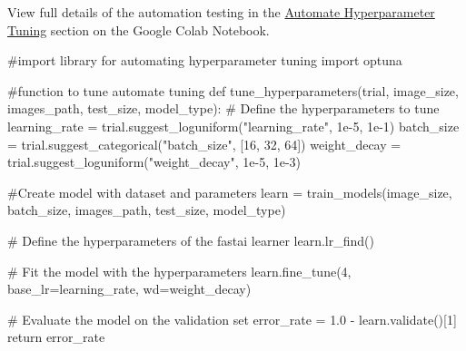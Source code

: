 \documentclass[
  letterpaper,
  DIV=11,
  numbers=noendperiod]{scrartcl}
\newenvironment{Shaded}{\begin{snugshade}}{\end{snugshade}}
\newcommand{\CommentTok}[1]{\textcolor[rgb]{0.37,0.37,0.37}{#1}}
\newcommand{\ControlFlowTok}[1]{\textcolor[rgb]{0.00,0.23,0.31}{#1}}
\newcommand{\DecValTok}[1]{\textcolor[rgb]{0.68,0.00,0.00}{#1}}
\newcommand{\FloatTok}[1]{\textcolor[rgb]{0.68,0.00,0.00}{#1}}
\newcommand{\ImportTok}[1]{\textcolor[rgb]{0.00,0.46,0.62}{#1}}
\newcommand{\KeywordTok}[1]{\textcolor[rgb]{0.00,0.23,0.31}{#1}}
\newcommand{\NormalTok}[1]{\textcolor[rgb]{0.00,0.23,0.31}{#1}}
\newcommand{\OperatorTok}[1]{\textcolor[rgb]{0.37,0.37,0.37}{#1}}
\newcommand{\StringTok}[1]{\textcolor[rgb]{0.13,0.47,0.30}{#1}}
\begin{document}
\begin{tcolorbox}[enhanced jigsaw, opacityback=0, toprule=.15mm, colbacktitle=quarto-callout-note-color!10!white, opacitybacktitle=0.6, leftrule=.75mm, colback=white, breakable, bottomtitle=1mm, arc=.35mm, toptitle=1mm, left=2mm, colframe=quarto-callout-note-color-frame, titlerule=0mm, coltitle=black, rightrule=.15mm, title=\textcolor{quarto-callout-note-color}{\faInfo}\hspace{0.5em}{Note}, bottomrule=.15mm]

View full details of the automation testing in the
\href{https://colab.research.google.com/drive/1yeosl7vmtW30dD0OBt96jLhi_p4ViRjI\#scrollTo=HShUwuqwuFad}{Automate
Hyperparameter Tuning} section on the Google Colab Notebook.

\end{tcolorbox}

\hypertarget{custom-tunehyperpar}{}
\begin{Shaded}
\begin{Highlighting}[]
\CommentTok{\#import library for automating hyperparameter tuning}
\ImportTok{import}\NormalTok{ optuna}

\CommentTok{\#function to tune automate tuning}
\KeywordTok{def}\NormalTok{ tune\_hyperparameters(trial, image\_size, images\_path, test\_size, model\_type):}
    \CommentTok{\# Define the hyperparameters to tune}
\NormalTok{    learning\_rate }\OperatorTok{=}\NormalTok{ trial.suggest\_loguniform(}\StringTok{"learning\_rate"}\NormalTok{, }\FloatTok{1e{-}5}\NormalTok{, }\FloatTok{1e{-}1}\NormalTok{)}
\NormalTok{    batch\_size }\OperatorTok{=}\NormalTok{ trial.suggest\_categorical(}\StringTok{"batch\_size"}\NormalTok{, [}\DecValTok{16}\NormalTok{, }\DecValTok{32}\NormalTok{, }\DecValTok{64}\NormalTok{])}
\NormalTok{    weight\_decay }\OperatorTok{=}\NormalTok{ trial.suggest\_loguniform(}\StringTok{"weight\_decay"}\NormalTok{, }\FloatTok{1e{-}5}\NormalTok{, }\FloatTok{1e{-}3}\NormalTok{)}

    \CommentTok{\#Create model with dataset and parameters}
\NormalTok{    learn }\OperatorTok{=}\NormalTok{ train\_models(image\_size, batch\_size, images\_path, test\_size, model\_type)}

    \CommentTok{\# Define the hyperparameters of the fastai learner}
\NormalTok{    learn.lr\_find()}

    \CommentTok{\# Fit the model with the hyperparameters}
\NormalTok{    learn.fine\_tune(}\DecValTok{4}\NormalTok{, base\_lr}\OperatorTok{=}\NormalTok{learning\_rate, wd}\OperatorTok{=}\NormalTok{weight\_decay)}

    \CommentTok{\# Evaluate the model on the validation set}
\NormalTok{    error\_rate }\OperatorTok{=} \FloatTok{1.0} \OperatorTok{{-}}\NormalTok{ learn.validate()[}\DecValTok{1}\NormalTok{]}
    \ControlFlowTok{return}\NormalTok{ error\_rate}
\end{Highlighting}
\end{Shaded}
\end{document}
